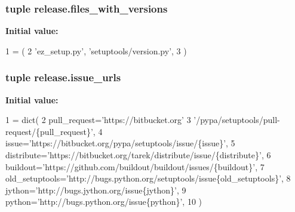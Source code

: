 \subsubsection[{files\+\_\+with\+\_\+versions}]{\setlength{\rightskip}{0pt plus 5cm}tuple release.\+files\+\_\+with\+\_\+versions}\label{namespacerelease_a8cd1b51d6bdeee649973fc036c88d60e}
{\bfseries Initial value\+:}
\begin{DoxyCode}
1 = (
2     \textcolor{stringliteral}{'ez\_setup.py'}, \textcolor{stringliteral}{'setuptools/version.py'},
3 )
\end{DoxyCode}
\hypertarget{namespacerelease_a11d939c4d1ec94f21a0cfd7e180f1735}{}
\subsubsection[{issue\+\_\+urls}]{\setlength{\rightskip}{0pt plus 5cm}tuple release.\+issue\+\_\+urls}\label{namespacerelease_a11d939c4d1ec94f21a0cfd7e180f1735}
{\bfseries Initial value\+:}
\begin{DoxyCode}
1 = dict(
2     pull\_request=\textcolor{stringliteral}{'https://bitbucket.org'}
3         \textcolor{stringliteral}{'/pypa/setuptools/pull-request/\{pull\_request\}'},
4     issue=\textcolor{stringliteral}{'https://bitbucket.org/pypa/setuptools/issue/\{issue\}'},
5     distribute=\textcolor{stringliteral}{'https://bitbucket.org/tarek/distribute/issue/\{distribute\}'},
6     buildout=\textcolor{stringliteral}{'https://github.com/buildout/buildout/issues/\{buildout\}'},
7     old\_setuptools=\textcolor{stringliteral}{'http://bugs.python.org/setuptools/issue\{old\_setuptools\}'},
8     jython=\textcolor{stringliteral}{'http://bugs.jython.org/issue\{jython\}'},
9     python=\textcolor{stringliteral}{'http://bugs.python.org/issue\{python\}'},
10 )
\end{DoxyCode}
\hypertarget{namespacerelease_a10e23691424654f839adbf69d9d69b4c}{}
